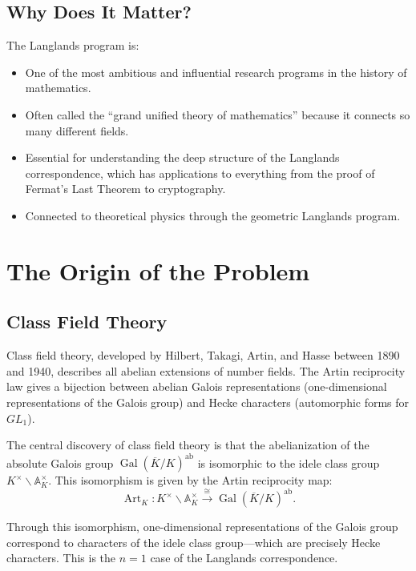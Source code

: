 \subsection{Why Does It Matter?}

The Langlands program is:
\begin{itemize}
\item One of the most ambitious and influential research programs in the history of mathematics.
\item Often called the ``grand unified theory of mathematics'' because it connects so many different fields.
\item Essential for understanding the deep structure of the Langlands correspondence, which has applications to everything from the proof of Fermat's Last Theorem to cryptography.
\item Connected to theoretical physics through the geometric Langlands program.
\end{itemize}

\section{The Origin of the Problem}

\subsection{Class Field Theory}

Class field theory, developed by Hilbert, Takagi, Artin, and Hasse between 1890 and 1940, describes all abelian extensions of number fields. The Artin reciprocity law gives a bijection between abelian Galois representations (one-dimensional representations of the Galois group) and Hecke characters (automorphic forms for $GL_1$).

The central discovery of class field theory is that the abelianization of the absolute Galois group $\operatorname{Gal}(\overline{K}/K)^{\text{ab}}$ is isomorphic to the idele class group $K^\times \backslash \mathbb{A}_K^\times$. This isomorphism is given by the Artin reciprocity map:
\[
\operatorname{Art}_K: K^\times \backslash \mathbb{A}_K^\times \xrightarrow{\cong} \operatorname{Gal}(\overline{K}/K)^{\text{ab}}.
\]

Through this isomorphism, one-dimensional representations of the Galois group correspond to characters of the idele class group---which are precisely Hecke characters. This is the $n=1$ case of the Langlands correspondence.

